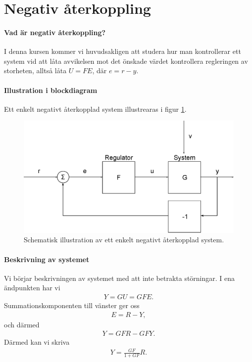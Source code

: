 \section{Negativ återkoppling}

\paragraph{Vad är negativ återkoppling?}
I denna kursen kommer vi huvudsakligen att studera hur man kontrollerar ett system vid att låta avvikelsen mot det önskade värdet kontrollera regleringen av storheten, alltså låta $U = FE$, där $e = r - y$.

\paragraph{Illustration i blockdiagram}
Ett enkelt negativt återkopplad system illustrearas i figur \ref{fig:negative_feedback}.
\begin{figure}[!ht]
	\centering
	\includegraphics[width = \textwidth]{./Images/negative_feedback.eps}
	\caption{Schematisk illustration av ett enkelt negativt återkopplad system.}
	\label{fig:negative_feedback}
\end{figure}

\paragraph{Beskrivning av systemet}
Vi börjar beskrivningen av systemet med att inte betrakta störningar. I ena ändpunkten har vi
\begin{align*}
	Y = GU = GFE.
\end{align*}
Summationskomponenten till vänster ger oss
\begin{align*}
	E = R - Y,
\end{align*}
och därmed
\begin{align*}
	Y = GFR - GFY.
\end{align*}
Därmed kan vi skriva
\begin{align*}
	Y = \frac{GF}{1 + GF}R.
\end{align*}

